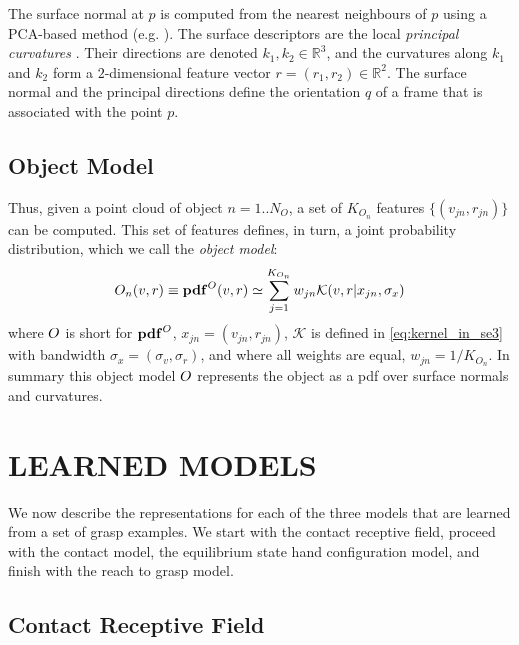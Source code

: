 The surface normal at $p$ is computed from the nearest neighbours of $p$ using a PCA-based method (e.g. \cite{kanatani2005statistical}). The surface descriptors are the local \emph{principal curvatures} \cite{spivak1979comprehensive}. Their directions are denoted $k_1, k_2 \in \mathbb R^3$, and the curvatures along $k_1$ and $k_2$ form a $2$-dimensional feature vector $r = (r_1, r_2) \in \mathbb R^2$. %
The surface normal and the principal directions define the orientation $q$ of a frame that is associated with the point $p$. 

\subsection{Object Model}
\label{sec:object_model}

Thus, given a point cloud of object $n = 1..N_O$, a set of $K_{O_n}$ features $\lbrace (v_{jn}, r_{jn}) \rbrace$ can be computed. This set of features defines, in turn, a joint probability distribution, which we call the \emph{object model}:
\begin{equation}
O_n(v, r) \equiv \mathbf{pdf}^O(v, r) \simeq \sum_{j=1}^{K_{O_n}} w_{jn} \mathcal{K}(v, r|{x_{jn}}, \sigma_{x})
\label{eq:om}
\end{equation}
where $O$ is short for $\mathbf{pdf}^O$, $x_{jn} = (v_{jn}, r_{jn})$,  $\mathcal{K}$ is defined in \eq\eqref{eq:kernel_in_se3} with bandwidth $\sigma_{x} = (\sigma_{v}, \sigma_{r})$, and where all weights are equal, $w_{jn} = 1/{K_{O_n}}$. In summary this object model $O$ represents the object as a pdf over surface normals and curvatures.

\section{LEARNED MODELS}

We now describe the representations for each of the three models that are learned from a set of grasp examples. We start with the contact receptive field, proceed with the contact model, the equilibrium state hand configuration model, and finish with the reach to grasp model.

\subsection{Contact Receptive Field}\label{sec:contact_recfield}

